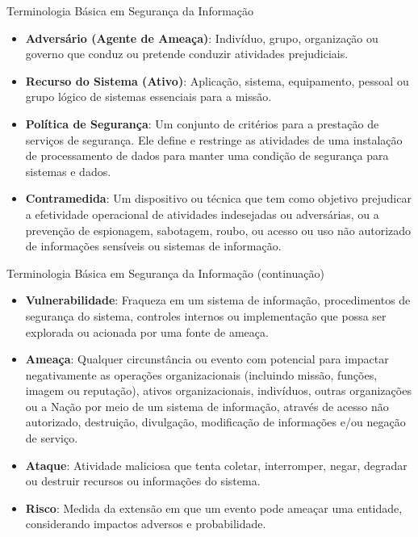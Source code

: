 \begin{frame}{Terminologia Básica em Segurança da Informação}
\begin{itemize}
    \item \textbf{Adversário (Agente de Ameaça)}:
Indivíduo, grupo, organização ou governo que conduz ou pretende conduzir atividades prejudiciais.


\item \textbf{Recurso do Sistema (Ativo)}:
Aplicação, sistema, equipamento, pessoal ou grupo lógico de sistemas essenciais para a missão.
 




\item \textbf{Política de Segurança}:
Um conjunto de critérios para a prestação de serviços de segurança. Ele define e restringe as atividades de uma instalação de processamento de dados para manter uma condição de segurança para sistemas e dados.

 \item \textbf{Contramedida}:
Um dispositivo ou técnica que tem como objetivo prejudicar a efetividade operacional de atividades indesejadas ou adversárias, ou a prevenção de espionagem, sabotagem, roubo, ou acesso ou uso não autorizado de informações sensíveis ou sistemas de informação.

\end{itemize}

\end{frame}




\begin{frame}{Terminologia Básica em Segurança da Informação (continuação)}
\begin{itemize}
  




\item \textbf{Vulnerabilidade}:
Fraqueza em um sistema de informação, procedimentos de segurança do sistema, controles internos ou implementação que possa ser explorada ou acionada por uma fonte de ameaça.



\item \textbf{Ameaça}:
Qualquer circunstância ou evento com potencial para impactar negativamente as operações organizacionais (incluindo missão, funções, imagem ou reputação), ativos organizacionais, indivíduos, outras organizações ou a Nação por meio de um sistema de informação, através de acesso não autorizado, destruição, divulgação, modificação de informações e/ou negação de serviço.

\item \textbf{Ataque}:
Atividade maliciosa que tenta coletar, interromper, negar, degradar ou destruir recursos ou informações do sistema.

  \item \textbf{Risco}:
Medida da extensão em que um evento pode ameaçar uma entidade, considerando impactos adversos e probabilidade.

\end{itemize}

\end{frame}

